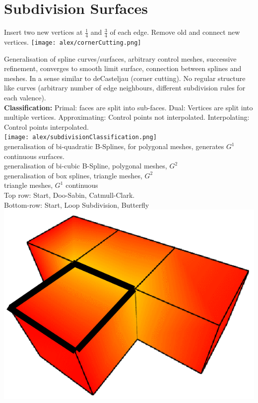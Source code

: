 \section{Subdivision Surfaces}

 Insert two new vertices at $\frac{1}{4}$ and $\frac{3}{4}$ of each edge. Remove old and connect new vertices.
\texttt{[image: alex/cornerCutting.png]}

 Generalisation of spline curves/surfaces, arbitrary control meshes, successive refinement, converges to smooth limit surface, connection between splines and meshes. In a sense similar to deCasteljau (corner cutting). No regular structure like curves (arbitrary number of edge neighbours, different subdivision rules for each valence). \\
\textbf{Classification:} Primal: faces are split into sub-faces. Dual: Vertices are split into multiple vertices. Approximating: Control points not interpolated. Interpolating: Control points interpolated.\\
\texttt{[image: alex/subdivisionClassification.png]}\\
generalisation of bi-quadratic B-Splines, for polygonal meshes, generates $G^1$ continuous surfaces.\\
  generalisation of bi-cubic B-Spline, polygonal meshes, $G^2$\\
 generalisation of box splines, triangle meshes, $G^2$\\
 triangle meshes, $G^1$ continuous\\
Top row: Start, Doo-Sabin, Catmull-Clark. \\
Bottom-row: Start, Loop Subdivision, Butterfly \\
\includegraphics[width=0.3\columnwidth]{assets/arjun/start-square.png}
